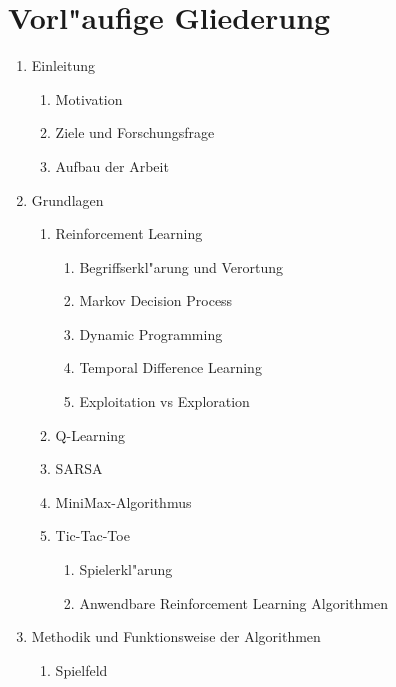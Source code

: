 \section*{Vorl"aufige Gliederung}
\renewcommand{\labelenumii}{\arabic{enumi}.\arabic{enumii}}
\renewcommand{\labelenumiii}{\arabic{enumi}.\arabic{enumii}.\arabic{enumiii}}
\begin{enumerate}
    \item Einleitung
        \begin{enumerate}
        \item Motivation
        \item Ziele und Forschungsfrage
        \item Aufbau der Arbeit
        \end{enumerate}
    \item Grundlagen
        \begin{enumerate}
        \item Reinforcement Learning
            \begin{enumerate}
            \item Begriffserkl"arung und Verortung
            \item Markov Decision Process
            \item Dynamic Programming
            \item Temporal Difference Learning
            \item Exploitation vs Exploration
            \end{enumerate}
        \item Q-Learning
        \item SARSA      
        \item MiniMax-Algorithmus
        \item Tic-Tac-Toe
            \begin{enumerate}
            \item Spielerkl"arung
            \item Anwendbare Reinforcement Learning Algorithmen
            \end{enumerate}
        \end{enumerate}
    \item Methodik und Funktionsweise der Algorithmen
        \begin{enumerate}
        \item Spielfeld

\end{enumerate}
\end{enumerate}
